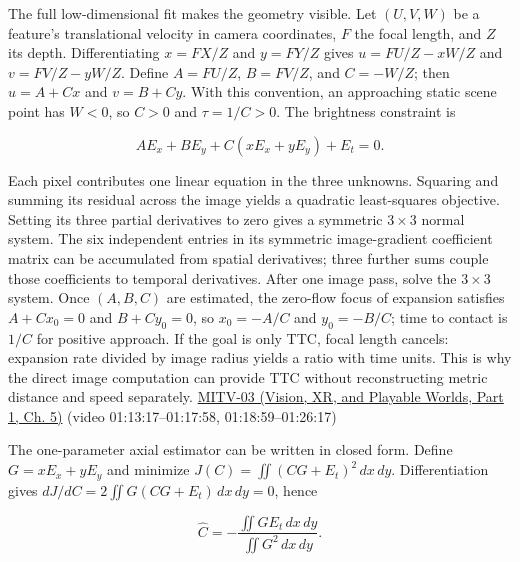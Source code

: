 The full low-dimensional fit makes the geometry visible. Let \((U,V,W)\) be a feature's translational velocity in camera coordinates, \(F\) the focal length, and \(Z\) its depth. Differentiating \(x=FX/Z\) and \(y=FY/Z\) gives \(u=FU/Z-xW/Z\) and \(v=FV/Z-yW/Z\). Define \(A=FU/Z\), \(B=FV/Z\), and \(C=-W/Z\); then \(u=A+Cx\) and \(v=B+Cy\). With this convention, an approaching static scene point has \(W<0\), so \(C>0\) and \(\tau=1/C>0\). The brightness constraint is

\[
AE_x+BE_y+C(xE_x+yE_y)+E_t=0.
\]

Each pixel contributes one linear equation in the three unknowns. Squaring and summing its residual across the image yields a quadratic least-squares objective. Setting its three partial derivatives to zero gives a symmetric \(3\times3\) normal system. The six independent entries in its symmetric image-gradient coefficient matrix can be accumulated from spatial derivatives; three further sums couple those coefficients to temporal derivatives. After one image pass, solve the \(3\times3\) system. Once \((A,B,C)\) are estimated, the zero-flow focus of expansion satisfies \(A+Cx_0=0\) and \(B+Cy_0=0\), so \(x_0=-A/C\) and \(y_0=-B/C\); time to contact is \(1/C\) for positive approach. If the goal is only TTC, focal length cancels: expansion rate divided by image radius yields a ratio with time units. This is why the direct image computation can provide TTC without reconstructing metric distance and speed separately. \href{../07-Vision-XR-and-Playable-Worlds-P01/main.pdf\#nameddest=04-visual-computing-ii-ch036-mitv-03---time-to-contact-focus-of-expansion-direct-motion-vision-methods-noise-gain}{MITV-03 (Vision, XR, and Playable Worlds, Part 1, Ch. 5)} (video 01:13:17--01:17:58, 01:18:59--01:26:17)

The one-parameter axial estimator can be written in closed form. Define \(G=xE_x+yE_y\) and minimize \(J(C)=\iint (CG+E_t)^2\,dx\,dy\). Differentiation gives \(dJ/dC=2\iint G(CG+E_t)\,dx\,dy=0\), hence

\[
\widehat C=-\frac{\iint GE_t\,dx\,dy}{\iint G^2\,dx\,dy}.
\]

